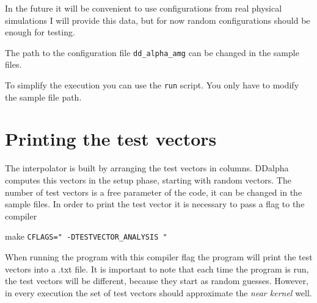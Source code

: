 \documentclass[a4paper,12pt]{scrartcl}
\begin{document}
\hspace{2mm}

In the future it will be convenient to use configurations from real physical simulations I will provide this data, but for now random configurations should be enough for testing.
 
The path to the configuration file \texttt{dd\_alpha\_amg} can be changed in the sample files. 

To simplify the execution you can use the \texttt{run} script. You only have to modify the sample file path.

\section{Printing the test vectors}
The interpolator is built by arranging the test vectors in columns. DDalpha computes this vectors in the setup phase, starting with random vectors. The number of test vectors is a free parameter of the code, it can be changed in the sample files. In order to print the test vector it is necessary to pass a flag to the compiler 

\begin{center}
make \texttt{CFLAGS=" -DTESTVECTOR\_ANALYSIS "}
\end{center}
When running the program with this compiler flag the program will print the test vectors into a .txt file. It is important to note that each time the program is run, the test vectors will be different, because they start as random guesses. However, in every execution the set of test vectors should approximate the \textit{near kernel} well.
\end{document}
